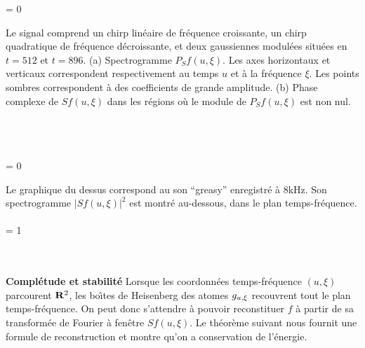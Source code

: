 \vspace{0cm}\setlength{\tabcolsep}{0cm} %
\setlength{\fboxsep}{0cm} %
\avecboite = 0
\begin{figtab}
\begin{figrow}{4}
{{\label{WFTChirps}
Le signal comprend un chirp lin\'{e}aire de fr\'{e}quence croissante, 
un chirp quadratique de fr\'{e}quence d\'{e}croissante, et deux 
gaussiennes modul\'{e}es situ\'{e}es en $t=512$ et $t=896$.
(a) Spectrogramme $P_S	f(u,\xi)$. Les axes horizontaux et
verticaux correspondent respectivement au temps $u$ et \`a la
fr\'equence $\xi$. Les points sombres correspondent
\`{a} des coefficients de grande amplitude.
(b) Phase complexe de $Sf(u,\xi)$ dans les r\'{e}gions o\`{u} le 
module de $P_S	f (u,\xi)$ est non nul.}}\\
\\

\\

\\

\end{figrow} 
\end{figtab}

\setlength{\tabcolsep}{0cm} %
\setlength{\fboxsep}{0cm} %
\avecboite = 0
\begin{figtab}
\begin{figrow}{2} {{Le graphique du dessus correspond au son ``greasy''
enregistr\'e \`a 8kHz. Son spectrogramme $|Sf(u,\xi)|^2$
est montr\'e au-dessous, dans le plan temps-fr\'equence.}
\label{spectrogram-parole}}\\

 \\
\avecboite = 1

\end{figrow} 
\end{figtab} 
\\
\\
\noindent
{\bf Compl\'etude et stabilit\'e}
Lorsque les coordonn\'{e}es temps-fr\'{e}quence $(u,\xi)$ parcourent 
${\bf{R}}^2$, les bo\^{\i}tes de Heisenberg des atomes $g_{u,\xi}$ recouvrent 
tout le plan temps-fr\'{e}quence. On peut donc s'attendre \`{a} 
pouvoir reconstituer $f$ \`{a} partir de sa transform\'{e}e de 
Fourier \`a fen\^{e}tre $Sf(u,\xi)$. Le th\'{e}or\`{e}me suivant nous fournit 
une formule de reconstruction et montre qu'on a conservation de 
l'\'{e}nergie.

